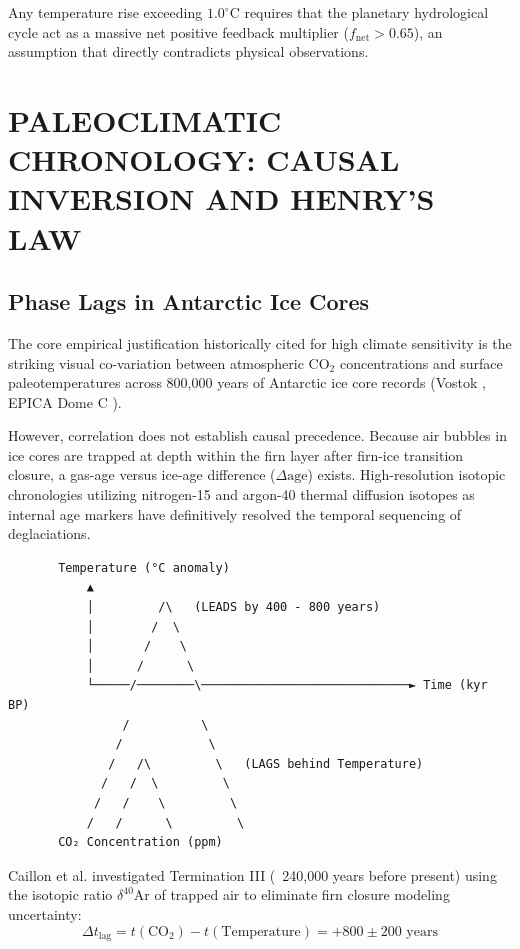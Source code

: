 \documentclass[10pt,twocolumn]{article}
\begin{document}
Any temperature rise exceeding $1.0^\circ\text{C}$ requires that the planetary hydrological cycle act as a massive net positive feedback multiplier ($f_{\text{net}} > 0.65$), an assumption that directly contradicts physical observations.



\section{PALEOCLIMATIC CHRONOLOGY: CAUSAL INVERSION AND HENRY'S LAW}


\subsection{Phase Lags in Antarctic Ice Cores}

The core empirical justification historically cited for high climate sensitivity is the striking visual co-variation between atmospheric $\text{CO}_2$ concentrations and surface paleotemperatures across 800,000 years of Antarctic ice core records (Vostok \cite{Petit1999}, EPICA Dome C \cite{Monnin2001, Jouzel2007}).

However, correlation does not establish causal precedence. Because air bubbles in ice cores are trapped at depth within the firn layer after firn-ice transition closure, a gas-age versus ice-age difference ($\Delta\text{age}$) exists. High-resolution isotopic chronologies utilizing nitrogen-15 and argon-40 thermal diffusion isotopes as internal age markers have definitively resolved the temporal sequencing of deglaciations.

\begin{verbatim}
       Temperature (°C anomaly)
           ▲
           │         /\   (LEADS by 400 - 800 years)
           │        /  \
           │       /    \
           │      /      \
           └─────/────────\─────────────────────────────► Time (kyr BP)
                /          \
               /            \
              /   /\         \   (LAGS behind Temperature)
             /   /  \         \
            /   /    \         \
           /   /      \         \
       CO₂ Concentration (ppm)
\end{verbatim}

Caillon et al. \cite{Caillon2003} investigated Termination III (~240,000 years before present) using the isotopic ratio $\delta^{40}\text{Ar}$ of trapped air to eliminate firn closure modeling uncertainty:
\begin{equation}
  \Delta t_{\text{lag}} = t(\text{CO}_2) - t(\text{Temperature}) = +800 \pm 200\text{ years}
\end{equation}
\end{document}
